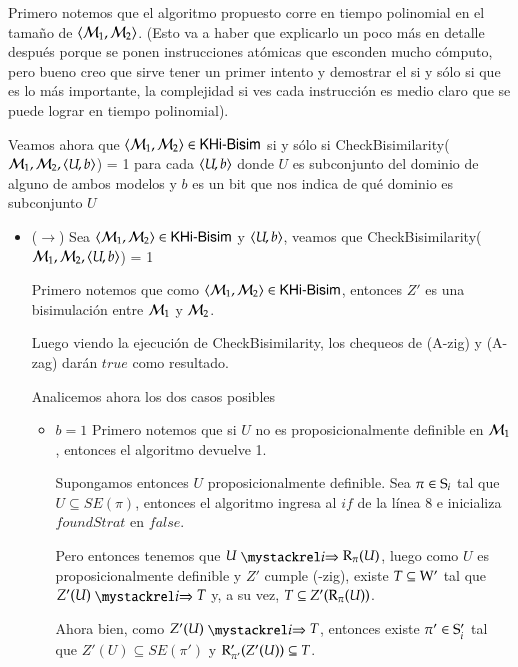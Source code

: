 \begin{demostracion}
    Primero notemos que el algoritmo propuesto corre en tiempo polinomial en el tamaño de $\tup{\modults_1,\modults_2}$.
    (Esto va a haber que explicarlo un poco más en detalle después porque se ponen instrucciones atómicas que esconden 
    mucho cómputo, pero bueno creo que sirve tener un primer intento y demostrar el si y sólo si 
    que es lo más importante, la complejidad si ves cada instrucción es medio claro que se puede lograr en tiempo polinomial).

    Veamos ahora que $\tup{\modults_1,\modults_2} \in \KHiBisim$ si y sólo si
    CheckBisimilarity($\modults_1,\modults_2,\tup{U,b}$) = 1 para cada $\tup{U,b}$ donde $U$ es subconjunto 
    del dominio de alguno de ambos modelos y $b$ es un bit que nos indica de qué dominio es subconjunto $U$

    \begin{itemize}
        \item ($\rightarrow$)
        Sea $\tup{\modults_1,\modults_2} \in \KHiBisim$ y $\tup{U,b}$, 
        veamos que CheckBisimilarity($\modults_1,\modults_2,\tup{U,b}$) = 1

        Primero notemos que como $\tup{\modults_1,\modults_2} \in \KHiBisim$, entonces $Z'$ es una bisimulación 
        entre $\modults_1$ y $\modults_2$.

        Luego viendo la ejecución de CheckBisimilarity, los chequeos de (A-zig) y (A-zag) darán $true$ como resultado.
        
        Analicemos ahora los dos casos posibles

        \begin{itemize}
            \item $b = 1$
                Primero notemos que si $U$ no es proposicionalmente definible en $\modults_1$, entonces el algoritmo devuelve 1.

                Supongamos entonces $U$ proposicionalmente definible. Sea $\pi \in \S_i$ tal que $U \subseteq SE(\pi)$, 
                entonces el algoritmo ingresa al $if$ de la línea 8 e inicializa $foundStrat$ en $false$.
                
                Pero entonces tenemos que $U \ultsExecAgi \R_\pi(U)$, luego como $U$ es proposicionalmente definible y 
                $Z'$ cumple (\KHilogic-zig), existe $T \subseteq \W'$ tal que $Z'(U) \ultsExecAgi T$ y,
                a su vez, $T \subseteq Z'(\R_\pi(U))$.
                
                Ahora bien, como $Z'(U) \ultsExecAgi T$, entonces existe $\pi' \in \S_i'$ tal que $Z'(U) \subseteq SE(\pi')$ y 
                $\R'_{\pi'}(Z'(U)) \subseteq T$.
                

\end{itemize}
\end{itemize}
\end{demostracion}
